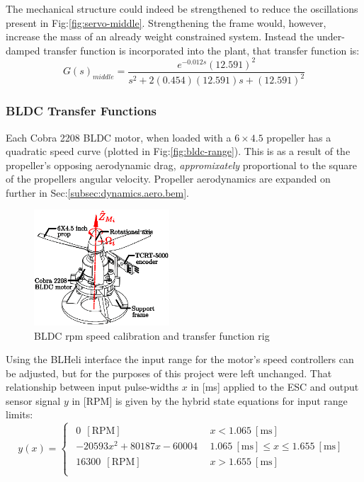 \par
The mechanical structure could indeed be strengthened to reduce the oscillations present in Fig:\ref{fig:servo-middle}. Strengthening the frame would, however, increase the mass of an already weight constrained system. Instead the under-damped transfer function is incorporated into the plant, that transfer function is:
\begin{equation}\label{eq:servo-transfer-middle}
G(s)_{middle}=\frac{e^{-0.012s}(12.591)^2}{s^2+2(0.454)(12.591)s+(12.591)^2}
\end{equation}
\subsubsection*{BLDC Transfer Functions}
Each Cobra 2208 BLDC motor, when loaded with a $6\times4.5$ propeller has a quadratic speed curve (plotted in Fig:\ref{fig:bldc-range}). This is as a result of the propeller's opposing aerodynamic drag, \emph{appromixately} proportional to the square of the propellers angular velocity. Propeller aerodynamics are expanded on further in Sec:\ref{subsec:dynamics.aero.bem}.
\begin{figure}[htbp]
\centering
\includegraphics[width=0.45\textwidth]{figs/bldc-rpm}
\caption{BLDC rpm speed calibration and transfer function rig}
\label{fig:bldc-rpm}
\vspace{-16pt}
\end{figure}
\par
Using the BLHeli interface the input range for the motor's speed controllers can be adjusted, but for the purposes of this project were left unchanged. That relationship between input pulse-widths $x$ in [ms] applied to the ESC and output sensor signal $y$ in [RPM] is given by the hybrid state equations for input range limits:
\begin{equation}
y(x)=
\begin{cases}\begin{array}{ll}
0 ~~[\text{RPM}]& ~~x<1.065~[\text{ms}]\\
-20593x^2 + 80187x - 60004 & ~~1.065~[\text{ms}] \leq x \leq 1.655~[\text{ms}]\\
16300 ~~[\text{RPM}]& ~~x>1.655~[\text{ms}]\\
\end{array}
\end{cases}
\label{eq:bldc-range}
\end{equation}

